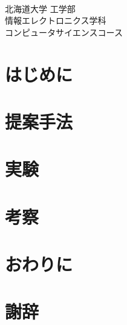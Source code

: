 \documentclass[a4j,11pt]{jarticle}
\begin{document}
\begin{titlepage}
 \setcounter{page}{0}
  \begin{center}
   \vspace*{2.0cm}
   \LARGE
   
   \\
   
   
   \vfill
   \LARGE
   北海道大学 工学部\\
   情報エレクトロニクス学科\\
コンピュータサイエンスコース\\
   \vspace{2ex}
   \vspace{2ex}
   \vspace*{2cm}
  \end{center}
\end{titlepage}
\tableofcontents \thispagestyle{empty}
 \newpage
 \listoffigures

 \listoftables
 \clearpage 
 \pagestyle{plain} 
 
 
\section{はじめに}

\newpage
\section{提案手法}

\newpage
\section{実験}

\newpage
\section{考察}

\newpage
\section{おわりに}


 \newpage
 \section*{謝辞}
 
 \newpage
\small


\end{document}
